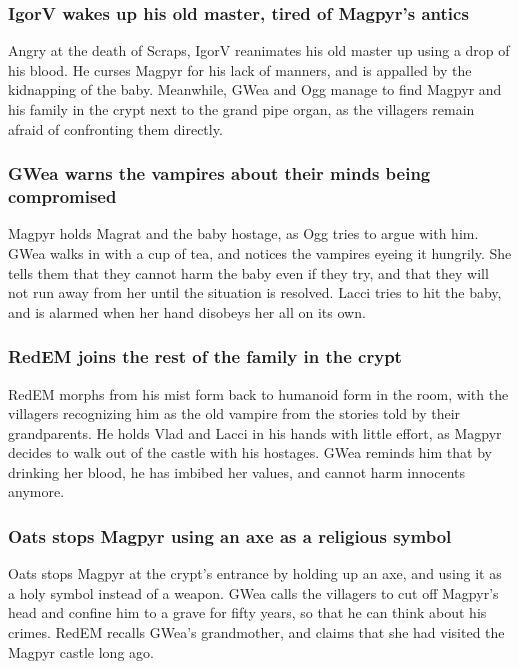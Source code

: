 \subsubsection{\Gls{IgorV} wakes up his old master, tired of \Gls{Magpyr}'s antics}
Angry at the death of \Gls{Scraps}, \Gls{IgorV} reanimates his old master up using a drop of his
blood. He curses \Gls{Magpyr} for his lack of manners, and is appalled by the kidnapping of the
baby. Meanwhile, \Gls{GWea} and \Gls{Ogg} manage to find \Gls{Magpyr} and his family in the
crypt next to the grand pipe organ, as the villagers remain afraid of confronting them directly.

\subsubsection{\Gls{GWea} warns the vampires about their minds being compromised}
\Gls{Magpyr} holds \Gls{Magrat} and the baby hostage, as \Gls{Ogg} tries to argue with him.
\Gls{GWea} walks in with a cup of tea, and notices the vampires eyeing it hungrily. She tells them
that they cannot harm the baby even if they try, and that they will not run away from her until
the situation is resolved. \Gls{Lacci} tries to hit the baby, and is alarmed when her hand disobeys
her all on its own.

\subsubsection{\Gls{RedEM} joins the rest of the family in the crypt}
\Gls{RedEM} morphs from his mist form back to humanoid form in the room, with the villagers
recognizing him as the old vampire from the stories told by their grandparents. He holds \Gls{Vlad}
and \Gls{Lacci} in his hands with little effort, as \Gls{Magpyr} decides to walk out of the
castle with his hostages. \Gls{GWea} reminds him that by drinking her blood, he has imbibed her
values, and cannot harm innocents anymore.

\subsubsection{\Gls{Oats} stops \Gls{Magpyr} using an axe as a religious symbol}
\Gls{Oats} stops \Gls{Magpyr} at the crypt's entrance by holding up an axe, and using it as a
holy symbol instead of a weapon. \Gls{GWea} calls the villagers to cut off \Gls{Magpyr}'s head and
confine him to a grave for fifty years, so that he can think about his crimes. \Gls{RedEM}
recalls \Gls{GWea}'s grandmother, and claims that she had visited the Magpyr castle long ago.

